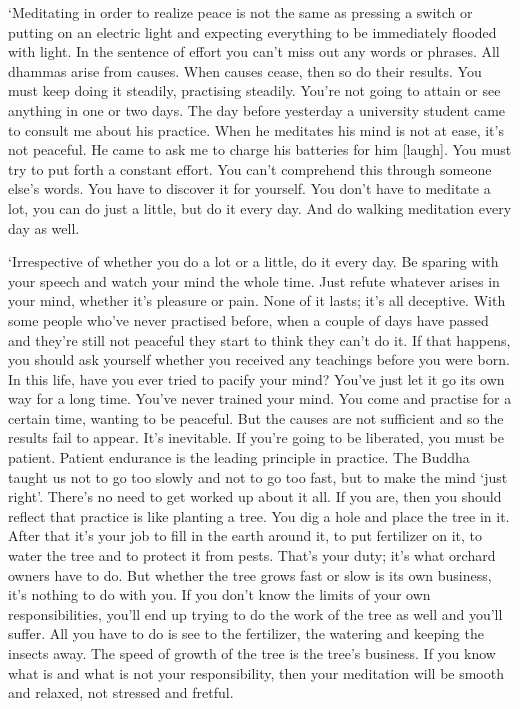 `Meditating in order to realize peace is not the same as pressing a
switch or putting on an electric light and expecting everything to be
immediately flooded with light. In the sentence of effort you can't miss
out any words or phrases. All dhammas arise from causes. When causes
cease, then so do their results. You must keep doing it steadily,
practising steadily. You're not going to attain or see anything in one
or two days. The day before yesterday a university student came to
consult me about his practice. When he meditates his mind is not at
ease, it's not peaceful. He came to ask me to charge his batteries for
him {[}laugh{]}. You must try to put forth a constant effort. You can't
comprehend this through someone else's words. You have to discover it
for yourself. You don't have to meditate a lot, you can do just a
little, but do it every day. And do walking meditation every day as
well.

`Irrespective of whether you do a lot or a little, do it every day. Be
sparing with your speech and watch your mind the whole time. Just refute
whatever arises in your mind, whether it's pleasure or pain. None of it
lasts; it's all deceptive. With some people who've never practised
before, when a couple of days have passed and they're still not peaceful
they start to think they can't do it. If that happens, you should ask
yourself whether you received any teachings before you were born. In
this life, have you ever tried to pacify your mind? You've just let it
go its own way for a long time. You've never trained your mind. You come
and practise for a certain time, wanting to be peaceful. But the causes
are not sufficient and so the results fail to appear. It's inevitable.
If you're going to be liberated, you must be patient. Patient endurance
is the leading principle in practice. The Buddha taught us not to go too
slowly and not to go too fast, but to make the mind `just right'.
There's no need to get worked up about it all. If you are, then you
should reflect that practice is like planting a tree. You dig a hole and
place the tree in it. After that it's your job to fill in the earth
around it, to put fertilizer on it, to water the tree and to protect it
from pests. That's your duty; it's what orchard owners have to do. But
whether the tree grows fast or slow is its own business, it's nothing to
do with you. If you don't know the limits of your own responsibilities,
you'll end up trying to do the work of the tree as well and you'll
suffer. All you have to do is see to the fertilizer, the watering and
keeping the insects away. The speed of growth of the tree is the tree's
business. If you know what is and what is not your responsibility, then
your meditation will be smooth and relaxed, not stressed and fretful.

